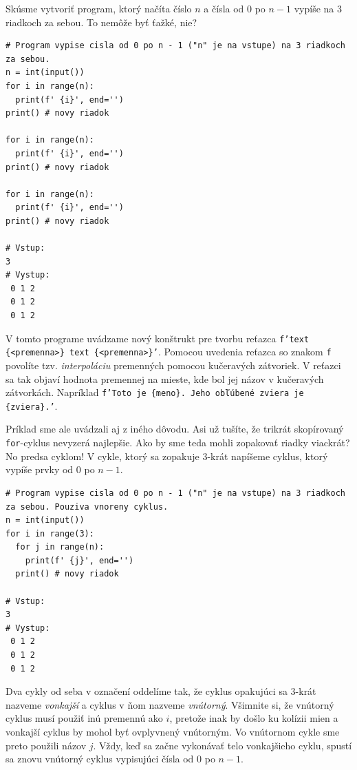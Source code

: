\documentclass{article}
\begin{document}
Skúsme vytvoriť program, ktorý načíta číslo $n$ a čísla od $0$ po $n - 1$ vypíše na 3 riadkoch za sebou. To nemôže byť ťažké, nie?
\begin{lstlisting}
# Program vypise cisla od 0 po n - 1 ("n" je na vstupe) na 3 riadkoch za sebou.
n = int(input())
for i in range(n):
  print(f' {i}', end='')
print() # novy riadok

for i in range(n):
  print(f' {i}', end='')
print() # novy riadok

for i in range(n):
  print(f' {i}', end='')
print() # novy riadok

# Vstup:
3
# Vystup:
 0 1 2
 0 1 2
 0 1 2
\end{lstlisting}
V tomto programe uvádzame nový konštrukt pre tvorbu reťazca \texttt{f'text \{<premenna>\} text \{<premenna>\}'}. Pomocou uvedenia reťazca so znakom \texttt{f} povolíte tzv. \textit{interpoláciu} premenných pomocou kučeravých zátvoriek. V reťazci sa tak objaví hodnota premennej na mieste, kde bol jej názov v kučeravých zátvorkách. Napríklad \texttt{f'Toto je \{meno\}. Jeho obľúbené zviera je \{zviera\}.'}.

Príklad sme ale uvádzali aj z iného dôvodu. Asi už tušíte, že trikrát skopírovaný \texttt{for}-cyklus nevyzerá najlepšie. Ako by sme teda mohli zopakovať riadky viackrát? No predsa cyklom! V cykle, ktorý sa zopakuje $3$-krát napíšeme cyklus, ktorý vypíše prvky od $0$ po $n - 1$.
\begin{lstlisting}
# Program vypise cisla od 0 po n - 1 ("n" je na vstupe) na 3 riadkoch za sebou. Pouziva vnoreny cyklus.
n = int(input())
for i in range(3):
  for j in range(n):
    print(f' {j}', end='')
  print() # novy riadok

# Vstup:
3
# Vystup:
 0 1 2
 0 1 2
 0 1 2
\end{lstlisting}
Dva cykly od seba v označení oddelíme tak, že cyklus opakujúci sa $3$-krát nazveme \textit{vonkajší} a cyklus v ňom nazveme \textit{vnútorný}. Všimnite si, že vnútorný cyklus musí použiť inú premennú ako $i$, pretože inak by došlo ku kolízii mien a vonkajší cyklus by mohol byť ovplyvnený vnútorným. Vo vnútornom cykle sme preto použili názov $j$.
Vždy, keď sa začne vykonávať telo vonkajšieho cyklu, spustí sa znovu vnútorný cyklus vypisujúci čísla od $0$ po $n - 1$.
\end{document}
